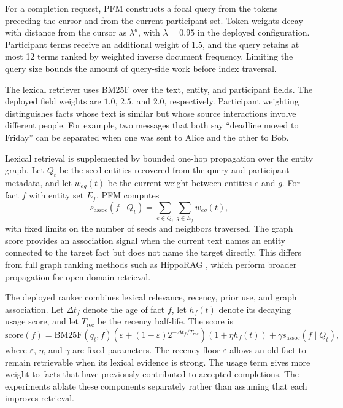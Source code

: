 \documentclass[letterpaper]{article} %
\begin{document}
For a completion request, PFM constructs a focal query from the tokens preceding the cursor and from the current participant set. Token weights decay with distance from the cursor as $\lambda^d$, with $\lambda=0.95$ in the deployed configuration. Participant terms receive an additional weight of $1.5$, and the query retains at most 12 terms ranked by weighted inverse document frequency. Limiting the query size bounds the amount of query-side work before index traversal.

The lexical retriever uses BM25F \citep{robertson2004simple,robertson2009probabilistic} over the text, entity, and participant fields. The deployed field weights are $1.0$, $2.5$, and $2.0$, respectively. Participant weighting distinguishes facts whose text is similar but whose source interactions involve different people. For example, two messages that both say ``deadline moved to Friday'' can be separated when one was sent to Alice and the other to Bob.

Lexical retrieval is supplemented by bounded one-hop propagation over the entity graph. Let $Q_t$ be the seed entities recovered from the query and participant metadata, and let $w_{eg}(t)$ be the current weight between entities $e$ and $g$. For fact $f$ with entity set $E_f$, PFM computes
\begin{equation}
s_{\mathrm{assoc}}(f\mid Q_t)=\sum_{e\in Q_t}\sum_{g\in E_f}w_{eg}(t),
\end{equation}
with fixed limits on the number of seeds and neighbors traversed. The graph score provides an association signal when the current text names an entity connected to the target fact but does not name the target directly. This differs from full graph ranking methods such as HippoRAG \citep{gutierrez2024hipporag}, which perform broader propagation for open-domain retrieval.

The deployed ranker combines lexical relevance, recency, prior use, and graph association. Let $\Delta t_f$ denote the age of fact $f$, let $h_f(t)$ denote its decaying usage score, and let $T_{\mathrm{rec}}$ be the recency half-life. The score is
\begin{equation}
\mathrm{score}(f)=\mathrm{BM25F}(q_t,f)\left(\varepsilon+(1-\varepsilon)2^{-\Delta t_f/T_{\mathrm{rec}}}\right)\left(1+\eta h_f(t)\right)+\gamma s_{\mathrm{assoc}}(f\mid Q_t),
\label{eq:pfm_score}
\end{equation}
where $\varepsilon$, $\eta$, and $\gamma$ are fixed parameters. The recency floor $\varepsilon$ allows an old fact to remain retrievable when its lexical evidence is strong. The usage term gives more weight to facts that have previously contributed to accepted completions. The experiments ablate these components separately rather than assuming that each improves retrieval.
\end{document}
